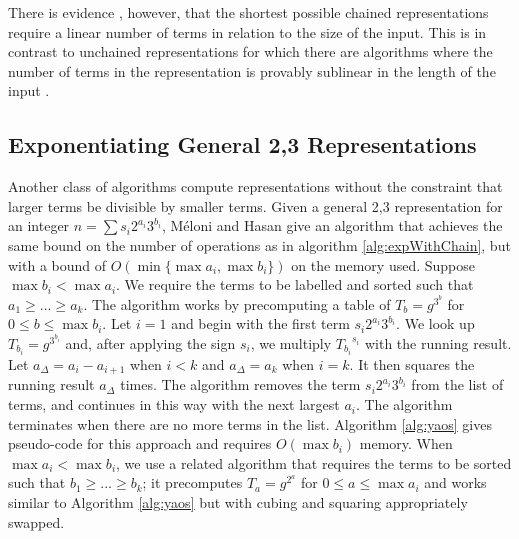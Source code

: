 \documentclass{ucalgthes1}
\theoremstyle{definition}
\begin{document}
There is evidence \cite{Imbert2010}, however, that the shortest possible chained representations require a linear number of terms in relation to the size of the input.  This is in contrast to unchained representations for which there are algorithms where the number of terms in the representation is provably sublinear in the length of the input \cite{Dimitrov2008, Ciet2005}.


\bigbreak
\subsection{Exponentiating General 2,3 Representations}

Another class of algorithms compute representations without the constraint that larger terms be divisible by smaller terms.  Given a general 2,3 representation for an integer $n = \sum s_i 2^{a_i} 3^{b_i}$, M\'{e}loni and Hasan \cite[Section 3.2]{Meloni2009} give an algorithm that achieves the same bound on the number of operations as in algorithm \ref{alg:expWithChain}, but with a bound of $O(\min \{\max a_i, \max b_i\})$ on the memory used.  Suppose $\max b_i < \max a_i$.  We require the terms to be labelled and sorted such that $a_1 \ge ... \ge a_k$.  The algorithm works by precomputing a table of $T_b = g^{3^b}$ for $0 \le b \le \max b_i$.  Let $i=1$ and begin with the first term $s_i2^{a_i}3^{b_i}$.  We look up $T_{b_i} = g^{3^{b_i}}$ and, after applying the sign $s_i$, we multiply ${T_{b_i}}^{s_i}$ with the running result.  Let $a_\Delta = a_i - a_{i+1}$ when $i < k$ and $a_\Delta = a_k$ when $i = k$.  It then squares the running result $a_\Delta$ times.  The algorithm removes the term $s_i2^{a_i}3^{b_i}$ from the list of terms, and continues in this way with the next largest $a_i$.  The algorithm terminates when there are no more terms in the list.  Algorithm  \ref{alg:yaos} gives pseudo-code for this approach and requires $O(\max b_i)$ memory.  When $\max a_i < \max b_i$, we use a related algorithm that requires the terms to be sorted such that $b_1 \ge ... \ge b_k$; it precomputes $T_a = g^{2^a}$ for $0 \le a \le \max a_i$ and works similar to Algorithm \ref{alg:yaos} but with cubing and squaring appropriately swapped.
\end{document}
